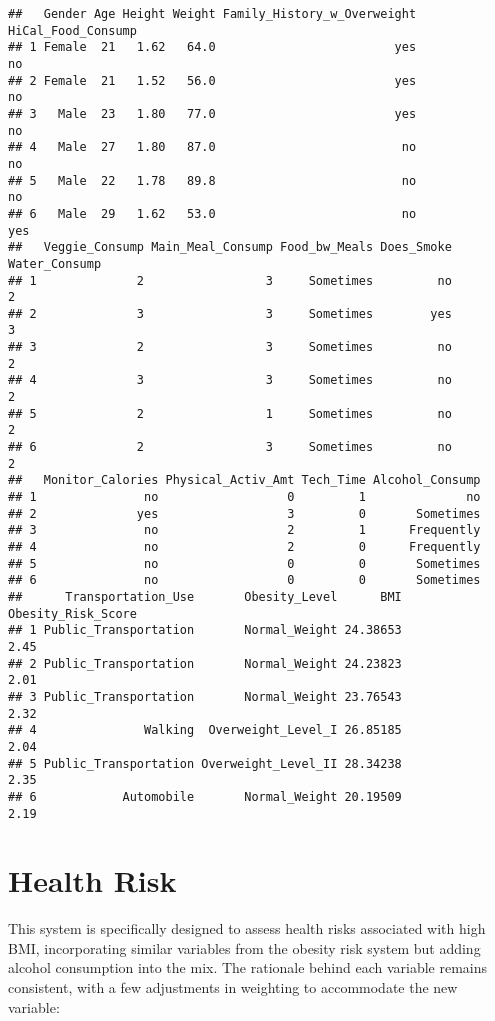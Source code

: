 \documentclass[
]{article}
\begin{document}
\begin{verbatim}
##   Gender Age Height Weight Family_History_w_Overweight HiCal_Food_Consump
## 1 Female  21   1.62   64.0                         yes                 no
## 2 Female  21   1.52   56.0                         yes                 no
## 3   Male  23   1.80   77.0                         yes                 no
## 4   Male  27   1.80   87.0                          no                 no
## 5   Male  22   1.78   89.8                          no                 no
## 6   Male  29   1.62   53.0                          no                yes
##   Veggie_Consump Main_Meal_Consump Food_bw_Meals Does_Smoke Water_Consump
## 1              2                 3     Sometimes         no             2
## 2              3                 3     Sometimes        yes             3
## 3              2                 3     Sometimes         no             2
## 4              3                 3     Sometimes         no             2
## 5              2                 1     Sometimes         no             2
## 6              2                 3     Sometimes         no             2
##   Monitor_Calories Physical_Activ_Amt Tech_Time Alcohol_Consump
## 1               no                  0         1              no
## 2              yes                  3         0       Sometimes
## 3               no                  2         1      Frequently
## 4               no                  2         0      Frequently
## 5               no                  0         0       Sometimes
## 6               no                  0         0       Sometimes
##      Transportation_Use       Obesity_Level      BMI Obesity_Risk_Score
## 1 Public_Transportation       Normal_Weight 24.38653               2.45
## 2 Public_Transportation       Normal_Weight 24.23823               2.01
## 3 Public_Transportation       Normal_Weight 23.76543               2.32
## 4               Walking  Overweight_Level_I 26.85185               2.04
## 5 Public_Transportation Overweight_Level_II 28.34238               2.35
## 6            Automobile       Normal_Weight 20.19509               2.19
\end{verbatim}

\hypertarget{health-risk}{%
\section{Health Risk}\label{health-risk}}

This system is specifically designed to assess health risks associated
with high BMI, incorporating similar variables from the obesity risk
system but adding alcohol consumption into the mix. The rationale behind
each variable remains consistent, with a few adjustments in weighting to
accommodate the new variable:
\end{document}
